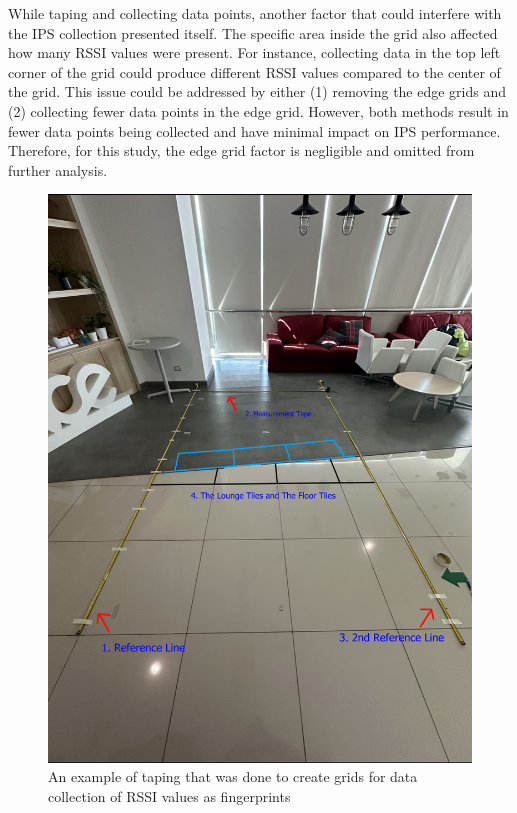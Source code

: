 \documentclass[conference]{IEEEtran}
\begin{document}
	While taping and collecting data points, another factor that could interfere with the IPS collection presented itself. The specific area inside the grid also affected how many RSSI values were present. For instance, collecting data in the top left corner of the grid could produce different RSSI values compared to the center of the grid. This issue could be addressed by either (1) removing the edge grids and (2) collecting fewer data points in the edge grid. However, both methods result in fewer data points being collected and have minimal impact on IPS performance. Therefore, for this study, the edge grid factor is negligible and omitted from further analysis.
	
	\begin{figure}[htbp]
		\centerline{\includegraphics[scale=0.21]{meth2.jpg}}
		\caption{An example of taping that was done to create grids for data collection of RSSI values as fingerprints}
		\label{fig:taping}
	\end{figure}
	
\end{document}
